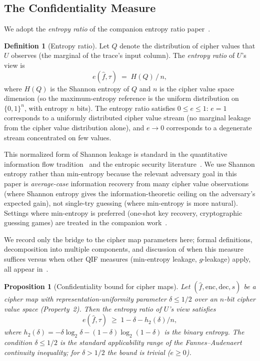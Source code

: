 \documentclass[11pt]{article}
\theoremstyle{definition}
\newtheorem{definition}{Definition}[section]
\theoremstyle{plain}
\newtheorem{proposition}[theorem]{Proposition}
\theoremstyle{remark}
\newcommand{\fhat}{\hat{f}}
\newcommand{\enc}{\mathrm{enc}}
\newcommand{\dec}{\mathrm{dec}}
\newcommand{\B}{\{0,1\}}
\begin{document}
\subsection{The Confidentiality Measure}
\label{subsec:conf-measure}

We adopt the \emph{entropy ratio} of the companion entropy ratio
paper~\cite[\S 4]{towell2026maxconf}.

\begin{definition}[Entropy ratio]
\label{def:entropy-ratio}
Let $Q$ denote the distribution of cipher values that $U$ observes
(the marginal of the trace's input column).  The \emph{entropy ratio}
of $U$'s view is
\[
e(\fhat, \tau) \;=\; H(Q) \,/\, n,
\]
where $H(Q)$ is the Shannon entropy of $Q$ and $n$ is the cipher value
space dimension (so the maximum-entropy reference is the uniform
distribution on $\B^n$, with entropy $n$ bits).  The entropy ratio
satisfies $0 \leq e \leq 1$: $e = 1$ corresponds to a uniformly
distributed cipher value stream (no marginal leakage from the cipher
value distribution alone), and $e \to 0$ corresponds to a degenerate
stream concentrated on few values.
\end{definition}

This normalized form of Shannon leakage is standard in the quantitative
information flow tradition~\cite{smith2009foundations,alvim2012measuring}
and the entropic security literature~\cite{dodis2005entropic}.  We use
Shannon entropy rather than min-entropy because the relevant adversary
goal in this paper is \emph{average-case} information recovery from
many cipher value observations (where Shannon entropy gives the
information-theoretic ceiling on the adversary's expected gain),
not single-try guessing (where min-entropy is more natural).  Settings
where min-entropy is preferred (one-shot key recovery, cryptographic
guessing games) are treated in the companion
work~\cite[\S 4]{towell2026maxconf}.

We record only the bridge to the cipher map parameters here; formal
definitions, decomposition into multiple components, and discussion of
when this measure suffices versus when other QIF measures (min-entropy
leakage, $g$-leakage) apply, all appear
in~\cite[\S 4]{towell2026maxconf}.

\begin{proposition}[Confidentiality bound for cipher maps]
\label{prop:confidentiality}
Let $(\fhat, \enc, \dec, s)$ be a cipher map with
representation-uniformity parameter $\delta \leq 1/2$ over an $n$-bit
cipher value space (Property~2).  Then the entropy ratio of $U$'s view
satisfies
\begin{equation}
\label{eq:fannes-bridge}
e(\fhat, \tau) \;\geq\; 1 - \delta - h_2(\delta) / n,
\end{equation}
where $h_2(\delta) = -\delta \log_2 \delta - (1 - \delta) \log_2(1 - \delta)$
is the binary entropy.  The condition $\delta \leq 1/2$ is the standard
applicability range of the Fannes--Audenaert continuity inequality; for
$\delta > 1/2$ the bound is trivial ($e \geq 0$).
\end{proposition}
\end{document}
